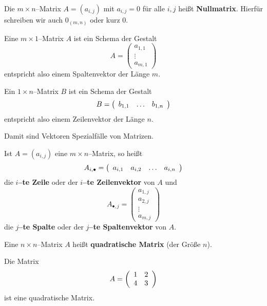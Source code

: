 \begin{beispiel} Die $m \times n$--Matrix $A = \left(a_{i,j}\right)$ mit $a_{i,j} = 0$ für alle $i, j$ 
heißt \textbf{Nullmatrix}. Hierfür schreiben wir auch $0_{(m,n)}$ oder kurz $0$.
\end{beispiel}


\begin{beispiel} Eine $m \times 1$--Matrix $A$ ist ein Schema der Gestalt
  	$$ A = \left( \begin{array} {c} 
	a_{1,1} \\ \vdots \\ a_{m,1} \end{array} \right) $$
entspricht also einem Spaltenvektor der Länge $m$.

Ein $1 \times n$--Matrix $B$ ist ein Schema der Gestalt
  	$$ B = \left( \begin{array} {c c c} 
	b_{1,1} & \ldots & b_{1,n} \end{array} \right) $$
entspricht also einem Zeilenvektor der Länge $n$.

Damit sind Vektoren Spezialfälle von Matrizen.
\end{beispiel}


\begin{definition} Ist $A = \left(a_{i,j} \right)$ eine $m  \times n$--Matrix, so heißt
  	$$ A_{i, \bullet} = \left( \begin{array}{l  l c l }
	a_{i,1} & a_{i,2} & \ldots & a_{i,n} \end{array} \right) $$
die \textbf{$i$--te Zeile} oder der \textbf{$i$--te Zeilenvektor}  von $A$ und 
  	$$ A_{\bullet, j} = \left( \begin{array} {c}
	a_{1,j} \\ a_{2, j} \\ \vdots \\ a_{m,j} \end{array} \right) $$
die \textbf{$j$--te Spalte} oder der \textbf{$j$--te Spaltenvektor} von $A$.
\end{definition}

 Eine $n \times n$--Matrix $A$ heißt  
\textbf{quadratische Matrix} (der Größe $n$).

\begin{beispiel} Die Matrix 
  	$$ A = \left( \begin{array}{ l  l }
	1 & 2 \\ 4 & 3 \end{array} \right) $$
ist eine quadratische Matrix.
\end{beispiel}


